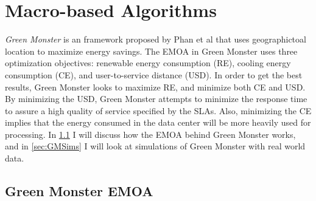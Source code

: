 \documentclass{sig-alternate}
\begin{document}
\section{Macro-based Algorithms}
\label{sec:MacAl}

\emph{Green Monster}
is an framework proposed by Phan et al that uses geographictoal location to maximize energy savings. The EMOA in Green Monster uses three optimization objectives: renewable energy consumption (RE), cooling energy consumption (CE), and user-to-service distance (USD). In order to get the best results, Green Monster looks to maximize RE, and minimize both CE and USD. By minimizing the USD, Green Monster attempts to minimize the response time to assure a high quality of service specified by the SLAs. Also, minimizing the CE implies that the energy consumed in the data center will be more heavily used for processing. In \ref{sec:GMEMOA} I will discuss how the EMOA behind Green Monster works, and in \ref{sec:GMSims} I will look at simulations of Green Monster with real world data.~\cite{Phan}

\subsection{Green Monster EMOA}
\label{sec:GMEMOA}
\end{document}
